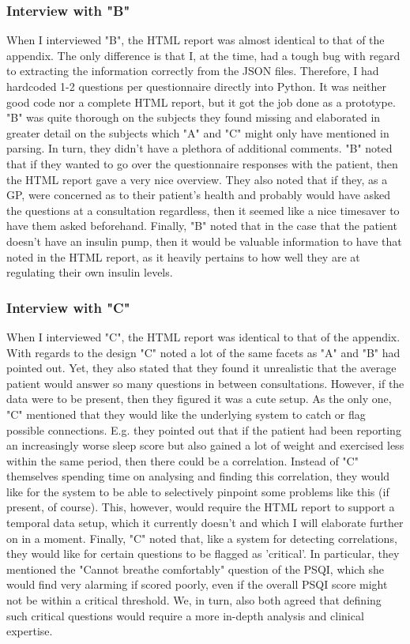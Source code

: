 \subsubsection*{Interview with "B"}
When I interviewed "B", the HTML report was almost identical to that of the appendix. The only difference is that I, at the time, had a tough bug with regard to extracting the information correctly from the JSON files. Therefore, I had hardcoded 1-2 questions per questionnaire directly into Python. It was neither good code nor a complete HTML report, but it got the job done as a prototype. "B" was quite thorough on the subjects they found missing and elaborated in greater detail on the subjects which "A" and "C" might only have mentioned in parsing. In turn, they didn't have a plethora of additional comments. "B" noted that if they wanted to go over the questionnaire responses with the patient, then the HTML report gave a very nice overview. They also noted that if they, as a GP, were concerned as to their patient's health and probably would have asked the questions at a consultation regardless, then it seemed like a nice timesaver to have them asked beforehand. Finally, "B" noted that in the case that the patient doesn't have an insulin pump, then it would be valuable information to have that noted in the HTML report, as it heavily pertains to how well they are at regulating their own insulin levels.

\subsubsection*{Interview with "C"}
When I interviewed "C", the HTML report was identical to that of the appendix. With regards to the design "C" noted a lot of the same facets as "A" and "B" had pointed out. Yet, they also stated that they found it unrealistic that the average patient would answer so many questions in between consultations. However, if the data were to be present, then they figured it was a cute setup. As the only one, "C" mentioned that they would like the underlying system to catch or flag possible connections. E.g. they pointed out that if the patient had been reporting an increasingly worse sleep score but also gained a lot of weight and exercised less within the same period, then there could be a correlation. Instead of "C" themselves spending time on analysing and finding this correlation, they would like for the system to be able to selectively pinpoint some problems like this (if present, of course). This, however, would require the HTML report to support a temporal data setup, which it currently doesn't and which I will elaborate further on in a moment. Finally, "C" noted that, like a system for detecting correlations, they would like for certain questions to be flagged as 'critical'. In particular, they mentioned the "Cannot breathe comfortably" question of the PSQI, which she would find very alarming if scored poorly, even if the overall PSQI score might not be within a critical threshold. We, in turn, also both agreed that defining such critical questions would require a more in-depth analysis and clinical expertise.

